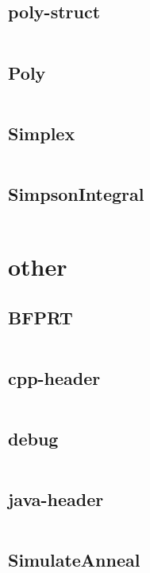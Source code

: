 \documentclass[a4]{article}
\begin{document}
\subsection{poly-struct}
\inputminted[mathescape,linenos,numbersep=5pt,frame=lines,framesep=2mm]{cpp}{src/math/poly-struct.cpp}
\subsection{Poly}
\inputminted[mathescape,linenos,numbersep=5pt,frame=lines,framesep=2mm]{cpp}{src/math/Poly.cpp}
\subsection{Simplex}
\inputminted[mathescape,linenos,numbersep=5pt,frame=lines,framesep=2mm]{cpp}{src/math/Simplex.cpp}
\subsection{SimpsonIntegral}
\inputminted[mathescape,linenos,numbersep=5pt,frame=lines,framesep=2mm]{cpp}{src/math/SimpsonIntegral.cpp}
\section{other}
\subsection{BFPRT}
\inputminted[mathescape,linenos,numbersep=5pt,frame=lines,framesep=2mm]{cpp}{src/other/BFPRT.cpp}
\subsection{cpp-header}
\inputminted[mathescape,linenos,numbersep=5pt,frame=lines,framesep=2mm]{cpp}{src/other/cpp-header.cpp}
\subsection{debug}
\inputminted[mathescape,linenos,numbersep=5pt,frame=lines,framesep=2mm]{h}{src/other/debug.h}
\subsection{java-header}
\inputminted[mathescape,linenos,numbersep=5pt,frame=lines,framesep=2mm]{java}{src/other/java-header.java}
\subsection{SimulateAnneal}
\inputminted[mathescape,linenos,numbersep=5pt,frame=lines,framesep=2mm]{cpp}{src/other/SimulateAnneal.cpp}
\end{document}
